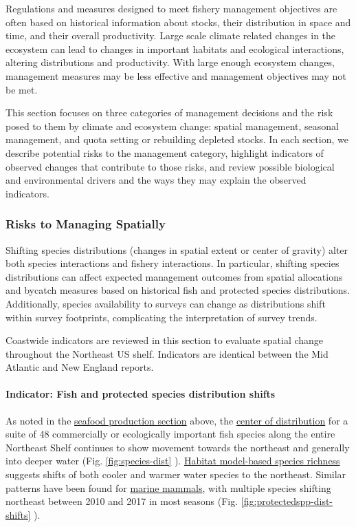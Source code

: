 \documentclass[
  10pt,
]{article}
\begin{document}
Regulations and measures designed to meet fishery management objectives are often based on historical information about stocks, their distribution in space and time, and their overall productivity. Large scale climate related changes in the ecosystem can lead to changes in important habitats and ecological interactions, altering distributions and productivity. With large enough ecosystem changes, management measures may be less effective and management objectives may not be met.

This section focuses on three categories of management decisions and the risk posed to them by climate and ecosystem change: spatial management, seasonal management, and quota setting or rebuilding depleted stocks. In each section, we describe potential risks to the management category, highlight indicators of observed changes that contribute to those risks, and review possible biological and environmental drivers and the ways they may explain the observed indicators.

\hypertarget{risks-to-managing-spatially}{%
\subsubsection{Risks to Managing Spatially}\label{risks-to-managing-spatially}}

Shifting species distributions (changes in spatial extent or center of gravity) alter both species interactions and fishery interactions. In particular, shifting species distributions can affect expected management outcomes from spatial allocations and bycatch measures based on historical fish and protected species distributions. Additionally, species availability to surveys can change as distributions shift within survey footprints, complicating the interpretation of survey trends.

Coastwide indicators are reviewed in this section to evaluate spatial change throughout the Northeast US shelf. Indicators are identical between the Mid Atlantic and New England reports.

\hypertarget{indicator-fish-and-protected-species-distribution-shifts}{%
\paragraph{Indicator: Fish and protected species distribution shifts}\label{indicator-fish-and-protected-species-distribution-shifts}}

As noted in the \protect\hyperlink{implications}{seafood production section} above, the \href{https://noaa-edab.github.io/catalog/species_dist.html}{center of distribution} for a suite of 48 commercially or ecologically important fish species along the entire Northeast Shelf continues to show movement towards the northeast and generally into deeper water (Fig. \ref{fig:species-dist} ). \href{https://noaa-edab.github.io/catalog/habitat_diversity.html}{Habitat model-based species richness} suggests shifts of both cooler and warmer water species to the northeast. Similar patterns have been found for \href{https://noaa-edab.github.io/catalog/cetacean_dist.html}{marine mammals}, with multiple species shifting northeast between 2010 and 2017 in most seasons (Fig. \ref{fig:protectedspp-dist-shifts} ).
\end{document}
